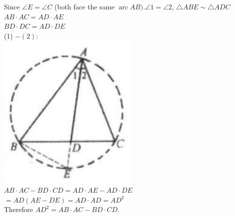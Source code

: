 \documentclass{article}
\begin{document}
Since \(\angle E=\angle C\) (both face the same \(\operatorname{arc} A B) . \angle 1=\angle 2\), \(\triangle A B E \sim \triangle A D C\)\\
\(A B \cdot A C=A D \cdot A E\)\\
\(B D \cdot D C=A D \cdot D E\)\\
(1) \(-(2):\)\\
\centering
\includegraphics[width=\textwidth]{images/196(1).jpg}\\
\(A B \cdot A C-B D \cdot C D=A D \cdot A E-A D \cdot D E\)\\
\(=A D(A E-D E)=A D \cdot A D=A D^{2}\)\\
Therefore \(A D^{2}=A B \cdot A C-B D \cdot C D\).
\end{document}
